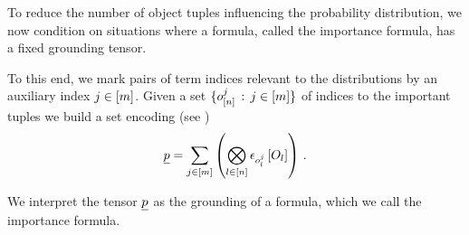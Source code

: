 %











To reduce the number of object tuples influencing the probability distribution, we now condition \HybridFOLNetworks{} on situations where a formula, called the importance formula, has a fixed grounding tensor.

To this end, we mark pairs of term indices relevant to the distributions by an auxiliary index $j\in[m]$.
Given a set $\{o_{[n]}^{j} \,:\, j\in[m] \}$ of indices to the important tuples we build a set encoding (see )
\begin{align*}
    \underline{p} = \sum_{j\in[m]} \left(
    \bigotimes_{l\in[n]} \epsilon_{o_{l}^{j}}\left[O_{l}\right]
    \right) \, .
\end{align*}

We interpret the tensor $\underline{p}$ as the grounding of a formula, which we call the importance formula.

